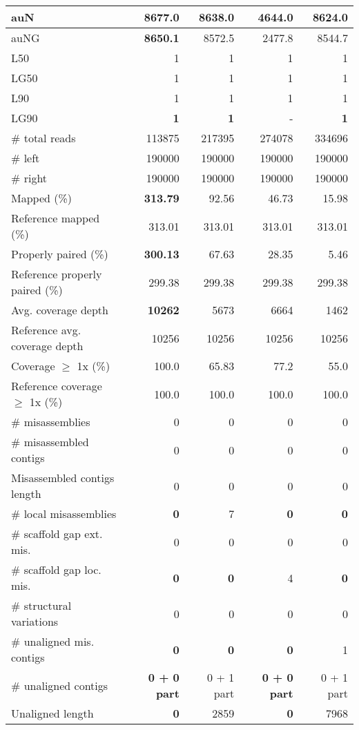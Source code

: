 \documentclass[12pt,a4paper]{article}
\begin{document}
\begin{table}[ht]
\begin{center}
\begin{tabular}{|l*{4}{|r}|}
auN & {\bf 8677.0} & 8638.0 & 4644.0 & 8624.0 \\ \hline
auNG & {\bf 8650.1} & 8572.5 & 2477.8 & 8544.7 \\ \hline
L50 & 1 & 1 & 1 & 1 \\ \hline
LG50 & 1 & 1 & 1 & 1 \\ \hline
L90 & 1 & 1 & 1 & 1 \\ \hline
LG90 & {\bf 1} & {\bf 1} & - & {\bf 1} \\ \hline
\# total reads & 113875 & 217395 & 274078 & 334696 \\ \hline
\# left & 190000 & 190000 & 190000 & 190000 \\ \hline
\# right & 190000 & 190000 & 190000 & 190000 \\ \hline
Mapped (\%) & {\bf 313.79} & 92.56 & 46.73 & 15.98 \\ \hline
Reference mapped (\%) & 313.01 & 313.01 & 313.01 & 313.01 \\ \hline
Properly paired (\%) & {\bf 300.13} & 67.63 & 28.35 & 5.46 \\ \hline
Reference properly paired (\%) & 299.38 & 299.38 & 299.38 & 299.38 \\ \hline
Avg. coverage depth & {\bf 10262} & 5673 & 6664 & 1462 \\ \hline
Reference avg. coverage depth & 10256 & 10256 & 10256 & 10256 \\ \hline
Coverage $\geq$ 1x (\%) & 100.0 & 65.83 & 77.2 & 55.0 \\ \hline
Reference coverage $\geq$ 1x (\%) & 100.0 & 100.0 & 100.0 & 100.0 \\ \hline
\# misassemblies & 0 & 0 & 0 & 0 \\ \hline
\# misassembled contigs & 0 & 0 & 0 & 0 \\ \hline
Misassembled contigs length & 0 & 0 & 0 & 0 \\ \hline
\# local misassemblies & {\bf 0} & 7 & {\bf 0} & {\bf 0} \\ \hline
\# scaffold gap ext. mis. & 0 & 0 & 0 & 0 \\ \hline
\# scaffold gap loc. mis. & {\bf 0} & {\bf 0} & 4 & {\bf 0} \\ \hline
\# structural variations & 0 & 0 & 0 & 0 \\ \hline
\# unaligned mis. contigs & {\bf 0} & {\bf 0} & {\bf 0} & 1 \\ \hline
\# unaligned contigs & {\bf 0 + 0 part} & 0 + 1 part & {\bf 0 + 0 part} & 0 + 1 part \\ \hline
Unaligned length & {\bf 0} & 2859 & {\bf 0} & 7968 \\ \hline

\end{tabular}
\end{center}
\end{table}
\end{document}
